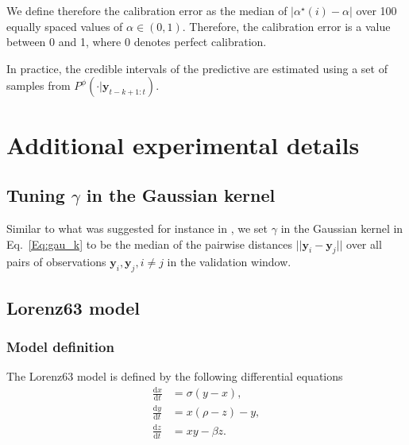 \documentclass[twoside,11pt]{article}
\newcommand{\ddobs}{\mathbf{y}}
\newcommand{\probfor}{P^\phi(\cdot|\ddobs_{t-k+1:t})}
\begin{document}
	We define therefore the calibration error as the median of $ |\alpha^\star(i) -\alpha |$ over 100 equally spaced values of $ \alpha\in(0,1) $. Therefore, the calibration error is a value between $ 0 $ and 1, where $ 0 $ denotes perfect calibration. 
	
	In practice, the credible intervals of the predictive are estimated using a set of samples from $ \probfor $. 
	
	
	
	
	
	
	
	
	
	
	
	
	
	
	
	
	
	\section{Additional experimental details}\label{app:exp_details}
	
	
	
	\subsection{Tuning $ \gamma $ in the Gaussian kernel}\label{app:gamma}
	
	Similar to what was suggested for instance in \cite{park2016k2}, we set $\gamma$ in the Gaussian kernel in Eq.~\eqref{Eq:gau_k} to be the median of the pairwise distances $||\ddobs_i- \ddobs_j||$ over all pairs of observations $\ddobs_i, \ddobs_j, i\neq j$ in the validation window.
	
	\subsection{Lorenz63 model}\label{app:Lorenz63}
	
	\subsubsection{Model definition}\label{app:Lorenz63_model}
	
	The Lorenz63 model \citep{lorenz1963deterministic} is defined by the following differential equations
	\begin{equation}\label{key}
	\begin{aligned}
	\frac{\mathrm{d}x}{\mathrm{d}t} &= \sigma (y - x), \\[6pt]
	\frac{\mathrm{d}y}{\mathrm{d}t} &= x (\rho - {z}) - y, \\[6pt]
	\frac{\mathrm{d}{z}}{\mathrm{d}t} &= x y - \beta z.
	\end{aligned} 
	\end{equation}
	
\end{document}
